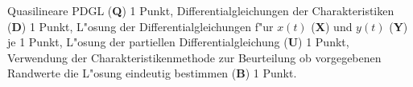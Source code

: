 \begin{bewertung}
Quasilineare PDGL ({\bf Q}) 1 Punkt,
Differentialgleichungen der Charakteristiken ({\bf D}) 1 Punkt,
L"osung der Differentialgleichungen f"ur $x(t)$ ({\bf X})
und $y(t)$ ({\bf Y}) je 1 Punkt,
L"osung der partiellen Differentialgleichung ({\bf U}) 1 Punkt,
Verwendung der Charakteristikenmethode zur Beurteilung ob
vorgegebenen Randwerte die L"osung eindeutig bestimmen ({\bf B}) 1 Punkt.
\end{bewertung}

